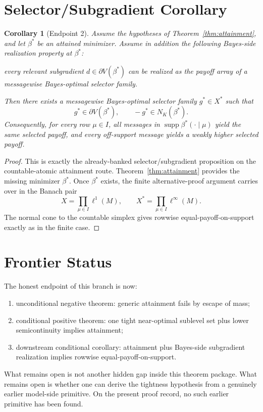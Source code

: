 \documentclass[12pt]{article}
\newtheorem{corollary}[theorem]{Corollary}
\newcommand{\supp}{\operatorname{supp}}
\begin{document}
\section{Selector/Subgradient Corollary}

\begin{corollary}[Endpoint 2]
\label{cor:endpoint2}
Assume the hypotheses of Theorem~\ref{thm:attainment}, and let $\beta^*$ be an attained minimizer.
Assume in addition the following Bayes-side realization property at $\beta^*$:

\medskip
\emph{every relevant subgradient $d \in \partial V(\beta^*)$ can be realized as the payoff array of a messagewise Bayes-optimal selector family.}

\medskip
Then there exists a messagewise Bayes-optimal selector family $g^* \in X^*$ such that
\[
g^* \in \partial V(\beta^*),
\qquad
-g^* \in N_K(\beta^*).
\]
Consequently, for every row $\mu \in I$, all messages in $\supp \beta^*(\cdot \mid \mu)$ yield the same selected payoff, and every off-support message yields a weakly higher selected payoff.
\end{corollary}

\begin{proof}
This is exactly the already-banked selector/subgradient proposition on the countable-atomic attainment route.
Theorem~\ref{thm:attainment} provides the missing minimizer $\beta^*$.
Once $\beta^*$ exists, the finite alternative-proof argument carries over in the Banach pair
\[
X = \prod_{\mu \in I} \ell^1(M),
\qquad
X^* = \prod_{\mu \in I} \ell^\infty(M).
\]
The normal cone to the countable simplex gives rowwise equal-payoff-on-support exactly as in the finite case.
\end{proof}

\section{Frontier Status}

The honest endpoint of this branch is now:

\begin{enumerate}
\item unconditional negative theorem:
generic attainment fails by escape of mass;
\item conditional positive theorem:
one tight near-optimal sublevel set plus lower semicontinuity implies attainment;
\item downstream conditional corollary:
attainment plus Bayes-side subgradient realization implies rowwise equal-payoff-on-support.
\end{enumerate}

What remains open is not another hidden gap inside this theorem package.
What remains open is whether one can derive the tightness hypothesis from a genuinely earlier
model-side primitive.
On the present proof record, no such earlier primitive has been found.
\end{document}
